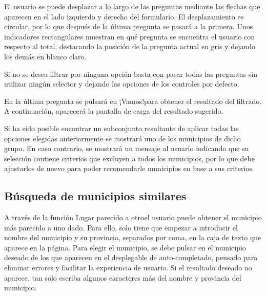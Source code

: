 
El usuario se puede desplazar a lo largo de las preguntas mediante las flechas que aparecen en el lado izquierdo y derecho del formulario. El desplazamiento es circular, por lo que después de la última pregunta se pasará a la primera. Unos indicadores rectangulares muestran en qué pregunta se encuentra el usuario con respecto al total, destacando la posición de la pregunta actual en gris y dejando los demás en blanco claro.


Si no se desea filtrar por ninguna opción basta con pasar todas las preguntas sin utilizar ningún selector y dejando las opciones de los controles por defecto.


En la última pregunta se pulsará en \guillemotleft ¡Vamos!\guillemotright\space para obtener el resultado del filtrado. A continuación, aparecerá la pantalla de carga del resultado sugerido.


Si ha sido posible encontrar un subconjunto resultante de aplicar todas las opciones elegidas anteriormente se mostrará uno de los municipios de dicho grupo. En caso contrario, se mostrará un mensaje al usuario indicando que su selección contiene criterios que excluyen a todos los municipios, por lo que debe ajustarlos de nuevo para poder recomendarle municipios en base a sus criterios.


\subsection{Búsqueda de municipios similares}

A través de la función \guillemotleft Lugar parecido a otro\guillemotright\space el usuario puede obtener el municipio más parecido a uno dado. Para ello, solo tiene que empezar a introducir el nombre del municipio y su provincia, separados por coma, en la caja de texto que aparece en la página. Para elegir el municipio, se debe pulsar en el municipio deseado de los que aparecen en el desplegable de auto-completado, pensado para eliminar errores y facilitar la experiencia de usuario. Si el resultado deseado no aparece, tan solo escriba algunos caracteres más del nombre y provincia del municipio.

